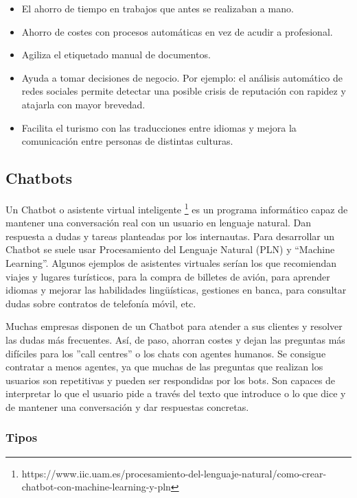 \begin{itemize}
	\item El ahorro de tiempo en trabajos que antes se realizaban a mano.
	\item Ahorro de costes con procesos automáticas en vez de acudir a profesional.
	\item Agiliza el etiquetado manual de documentos.
	\item Ayuda a tomar decisiones de negocio. Por ejemplo: el análisis automático de redes sociales permite detectar una posible crisis de reputación con rapidez y atajarla con mayor brevedad.
	\item Facilita el turismo con las traducciones entre idiomas y mejora la comunicación entre personas de distintas culturas.
\end{itemize}


\subsection{Chatbots}

Un Chatbot o asistente virtual inteligente \footnote{https://www.iic.uam.es/procesamiento-del-lenguaje-natural/como-crear-chatbot-con-machine-learning-y-pln} es un programa informático capaz de mantener una conversación real con un usuario en lenguaje natural. Dan respuesta a dudas y tareas planteadas por los internautas. Para desarrollar un Chatbot se suele usar Procesamiento del Lenguaje Natural (PLN) y ``Machine Learning''.  Algunos ejemplos de asistentes virtuales serían los que recomiendan viajes y lugares turísticos, para la compra de billetes de avión, para aprender idiomas y mejorar las habilidades lingüísticas, gestiones en banca, para consultar dudas sobre contratos de telefonía móvil, etc.

Muchas empresas disponen de un Chatbot para atender a sus clientes y resolver las dudas más frecuentes. Así, de paso, ahorran costes y dejan las preguntas más difíciles para los ''call centres'' o los chats con agentes humanos. Se consigue  contratar a menos agentes, ya que muchas de las preguntas que realizan los usuarios son repetitivas y pueden ser respondidas por los bots. Son capaces de interpretar lo que el usuario pide a través del texto que introduce o lo que dice y de mantener una conversación y dar respuestas concretas. 

\subsubsection{Tipos}

